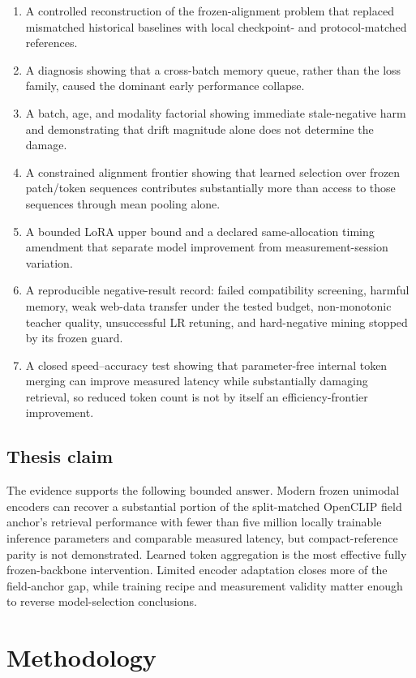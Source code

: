 \begin{enumerate}
\item A controlled reconstruction of the frozen-alignment problem that replaced mismatched historical baselines with local checkpoint- and protocol-matched references.
\item A diagnosis showing that a cross-batch memory queue, rather than the loss family, caused the dominant early performance collapse.
\item A batch, age, and modality factorial showing immediate stale-negative harm and demonstrating that drift magnitude alone does not determine the damage.
\item A constrained alignment frontier showing that learned selection over frozen patch/token sequences contributes substantially more than access to those sequences through mean pooling alone.
\item A bounded LoRA upper bound and a declared same-allocation timing amendment that separate model improvement from measurement-session variation.
\item A reproducible negative-result record: failed compatibility screening, harmful memory, weak web-data transfer under the tested budget, non-monotonic teacher quality, unsuccessful LR retuning, and hard-negative mining stopped by its frozen guard.
\item A closed speed--accuracy test showing that parameter-free internal token merging can improve measured latency while substantially damaging retrieval, so reduced token count is not by itself an efficiency-frontier improvement.
\end{enumerate}
\section{Thesis claim}
The evidence supports the following bounded answer. Modern frozen unimodal encoders can recover a substantial portion of the split-matched OpenCLIP field anchor's retrieval performance with fewer than five million locally trainable inference parameters and comparable measured latency, but compact-reference parity is not demonstrated. Learned token aggregation is the most effective fully frozen-backbone intervention. Limited encoder adaptation closes more of the field-anchor gap, while training recipe and measurement validity matter enough to reverse model-selection conclusions.

\chapter{Methodology}
